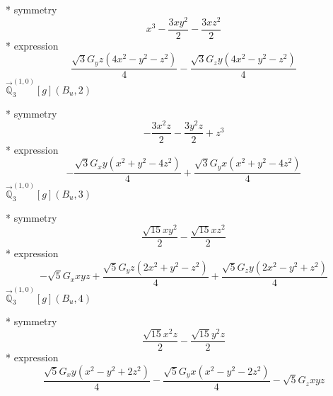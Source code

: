 \documentclass[fleqn,8pt]{jsarticle}
\begin{document}
\noindent\quad ** symmetry
\begin{dmath*}
x^{3} - \frac{3 x y^{2}}{2} - \frac{3 x z^{2}}{2}
\end{dmath*}
\noindent\quad ** expression
\begin{dmath*}
\frac{\sqrt{3} G_{y} z \left(4 x^{2} - y^{2} - z^{2}\right)}{4} - \frac{\sqrt{3} G_{z} y \left(4 x^{2} - y^{2} - z^{2}\right)}{4}
\end{dmath*}
\noindent\quad $\vec{\mathbb{Q}}_{3}^{(1,0)}[g](B_{u},2)$

\noindent\quad ** symmetry
\begin{dmath*}
- \frac{3 x^{2} z}{2} - \frac{3 y^{2} z}{2} + z^{3}
\end{dmath*}
\noindent\quad ** expression
\begin{dmath*}
- \frac{\sqrt{3} G_{x} y \left(x^{2} + y^{2} - 4 z^{2}\right)}{4} + \frac{\sqrt{3} G_{y} x \left(x^{2} + y^{2} - 4 z^{2}\right)}{4}
\end{dmath*}
\noindent\quad $\vec{\mathbb{Q}}_{3}^{(1,0)}[g](B_{u},3)$

\noindent\quad ** symmetry
\begin{dmath*}
\frac{\sqrt{15} x y^{2}}{2} - \frac{\sqrt{15} x z^{2}}{2}
\end{dmath*}
\noindent\quad ** expression
\begin{dmath*}
- \sqrt{5} G_{x} x y z + \frac{\sqrt{5} G_{y} z \left(2 x^{2} + y^{2} - z^{2}\right)}{4} + \frac{\sqrt{5} G_{z} y \left(2 x^{2} - y^{2} + z^{2}\right)}{4}
\end{dmath*}
\noindent\quad $\vec{\mathbb{Q}}_{3}^{(1,0)}[g](B_{u},4)$

\noindent\quad ** symmetry
\begin{dmath*}
\frac{\sqrt{15} x^{2} z}{2} - \frac{\sqrt{15} y^{2} z}{2}
\end{dmath*}
\noindent\quad ** expression
\begin{dmath*}
\frac{\sqrt{5} G_{x} y \left(x^{2} - y^{2} + 2 z^{2}\right)}{4} - \frac{\sqrt{5} G_{y} x \left(x^{2} - y^{2} - 2 z^{2}\right)}{4} - \sqrt{5} G_{z} x y z
\end{dmath*}
\end{document}
